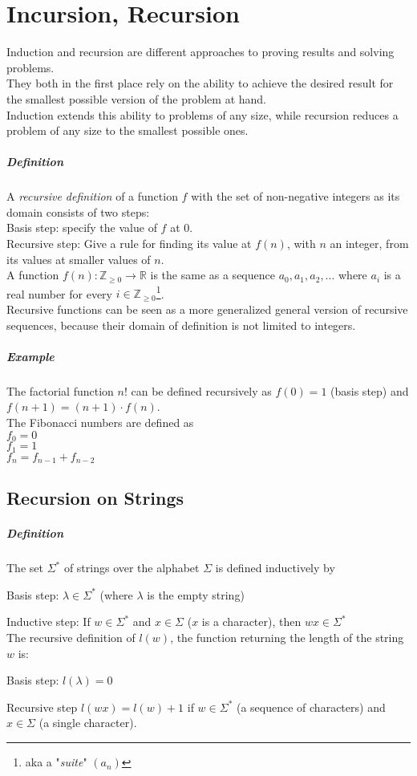 \documentclass[10pt,a4paper]{book}
\newcommand{\R}{\mathbb{R}}
\newcommand{\Z}{\mathbb{Z}}
\newcommand{\ind}{\hspace*{\parindent}}
\begin{document}
\chapter{Incursion, Recursion}
Induction and recursion are different approaches to proving 
results and solving problems.\\
They both in the first place rely on the ability to achieve the 
desired result for the smallest possible version of the problem 
at hand.\\
Induction extends this ability to problems of any size, while recursion reduces a problem of any size to the smallest 
possible ones.\\
\paragraph*{Definition}
A \textit{recursive definition} of a function $f$ with the set of non-negative integers as its domain consists of two steps:\\
\ind Basis step: specify the value of $f$ at 0.\\
\ind Recursive step: Give a rule for finding its value at $f(n)$, with $n$ an integer, from its values at smaller values of $n$.\\
A function $f(n): \Z_{\geqslant 0} \to \R$ is the same as a sequence $a_0,a_1,a_2,...$ where $a_i$ is a real number for every $i \in \Z_{\geqslant 0}$\footnote{aka a "\textit{suite}" $(a_n)$}.\\
Recursive functions can be seen as a more generalized general version of recursive sequences, because their domain of definition is not limited to integers.
\paragraph*{Example}
The factorial function $n!$ can be defined recursively as $f(0)=1$ (basis step) and $f(n+1)=(n+1)\cdot f(n)$.\\
The Fibonacci numbers are defined as\\
$f_{0}=0$\\$f_{1}=1$\\$f_{n}=f_{n-1}+f_{n-2}$
\section{Recursion on Strings}
\paragraph*{Definition}
The set $\Sigma^{*}$ of strings over the alphabet $\Sigma$ is defined inductively by\par
Basis step: $\lambda \in \Sigma^{*}$ (where $\lambda$ is the empty string)\par
Inductive step: If $w \in \Sigma^{*}$ and $x \in \Sigma$ ($x$ is a character), then $wx \in \Sigma^{*}$\\
The recursive definition of $l(w)$, the function returning the length of the string $w$ is:\par
Basis step: $l(\lambda)=0$\par
Recursive step $l(wx)=l(w)+1$ if $w\in \Sigma^{*}$ (a sequence of characters) and $x \in \Sigma$ (a single character).
\end{document}
